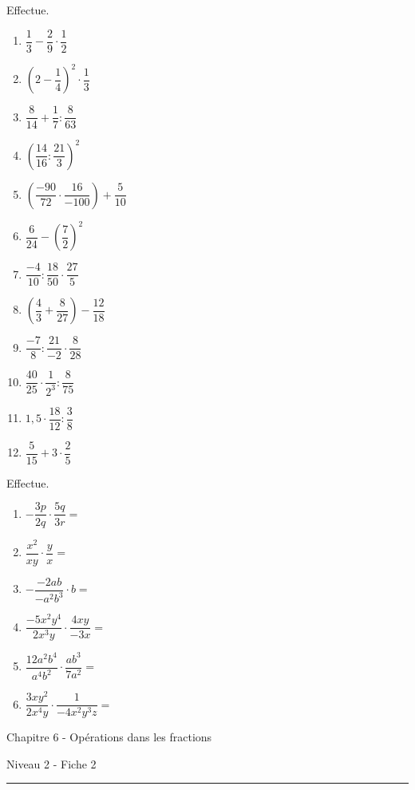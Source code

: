 \documentclass[12pt,parskip=half-, twoside=semi]{scrartcl}
\begin{document}
  \begin{exercise}
    Effectue.
    \begin{enumerate}[cols=3]
      \item $\dfrac{1}{3}-\dfrac{2}{9}\cdot\dfrac{1}{2}$
      \item $\left(2-\dfrac{1}{4}\right)^2 \cdot \dfrac{1}{3}$
      \item $\dfrac{8}{14} + \dfrac{1}{7}:\dfrac{8}{63}$
      \item $\left(\dfrac{14}{16}:\dfrac{21}{3}\right)^2$
      \item $\left(\dfrac{-90}{72} \cdot \dfrac{16}{-100}\right) + \dfrac{5}{10} $
      \item $\dfrac{6}{24} - \left(\dfrac{7}{2}\right)^2$
      \item $\dfrac{-4}{10} : \dfrac{18}{50} \cdot \dfrac{27}{5}$
      \item $\left(\dfrac{4}{3} + \dfrac{8}{27}\right) - \dfrac{12}{18}$
      \item $\dfrac{-7}{8} : \dfrac{21}{-2}\cdot\dfrac{8}{28}$
      \item $\dfrac{40}{25}\cdot\dfrac{1}{2^3} : \dfrac{8}{75}$
      \item $1,5\cdot \dfrac{18}{12}:\dfrac{3}{8}$
      \item $\dfrac{5}{15} + 3\cdot\dfrac{2}{5}$
    \end{enumerate}
  \end{exercise}

  \begin{exercise}
    Effectue.
    \begin{enumerate}[cols=2]
      \item  $-\dfrac{3p}{2q} \cdot \dfrac{5q}{3r}=$
      \item  $\dfrac{x^2}{xy} \cdot \dfrac{y}{x}=$
      \item  $-\dfrac{-2ab}{-a^2b^3} \cdot b=$
      \item  $\dfrac{-5x^2y^4}{2x^3y} \cdot \dfrac{4xy}{-3x}=$
      \item  $\dfrac{12a^2b^4}{a^4b^2} \cdot \dfrac{ab^3}{7a^2}=$
      \item  $\dfrac{3xy^2}{2x^4y} \cdot \dfrac{1}{-4x^2y^3z}=$
    \end{enumerate}
  \end{exercise}
   
\newpage

  \begin{center}
    \bfseries
    \begin{Huge}
      Chapitre 6 - Opérations dans les fractions
    \end{Huge}
    \smallbreak
    \begin{large}
      Niveau 2  - Fiche 2
    \end{large}
    \smallbreak
    \rule[10pt]{.5\linewidth}{1 pt}
  \end{center}
  
\end{document}
